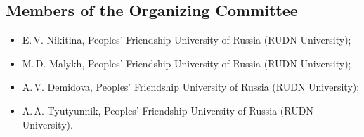 \subsection*{Members of the Organizing Committee}

\begin{itemize}
\item E.\,V. Nikitina, Peoples’ Friendship University of Russia (RUDN University);
\item M.\,D. Malykh, Peoples’ Friendship University of Russia (RUDN University);
\item A.\,V. Demidova, Peoples’ Friendship University of Russia (RUDN University);
\item A.\,A. Tyutyunnik, Peoples’ Friendship University of Russia (RUDN University).
\end{itemize}
